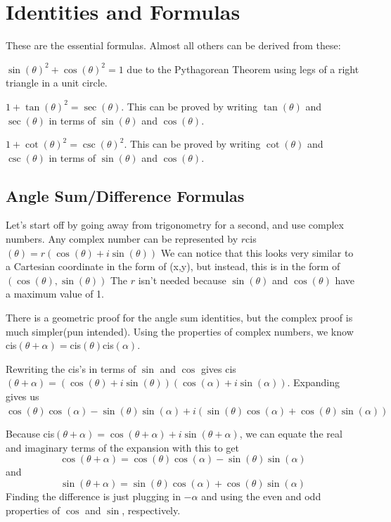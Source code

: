 \documentclass{article}
\begin{document}
\pagebreak
\section{Identities and Formulas}

These are the essential formulas. Almost all others can be derived from these:



\begin{theorem}
\noindent $\sin(\theta)^2+\cos(\theta)^2=1$ due to the Pythagorean Theorem using legs of a right triangle in a unit circle.

\vspace{5mm}
\noindent $1+\tan(\theta)^2=\sec(\theta)$. This can be proved by writing $\tan(\theta)$ and $\sec(\theta)$ in terms of $\sin(\theta)$ and $\cos(\theta)$. 

\vspace{5mm}
\noindent $1+\cot(\theta)^2=\csc(\theta)^2.$ This can be proved by writing $\cot(\theta)$ and $\csc(\theta)$ in terms of $\sin(\theta)$ and $\cos(\theta)$.
\end{theorem}

\subsection{Angle Sum/Difference Formulas}

Let's start off by going away from trigonometry for a second, and use complex numbers. Any complex number can be represented by $r$cis$(\theta)=r(\cos(\theta)+i\sin(\theta))$ We can notice that this looks very similar to a Cartesian coordinate in the form of (x,y), but instead, this is in the form of $(\cos(\theta),\sin(\theta))$ The $r$ isn't needed because $\sin(\theta)$ and $\cos(\theta)$ have a maximum value of 1. 

\vspace{5mm}
\noindent There is a geometric proof for the angle sum identities, but the complex proof is much simpler(pun intended). Using the properties of complex numbers, we know cis$(\theta+\alpha) = $cis$(\theta)$cis$(\alpha)$. 

\vspace{5mm}
\noindent Rewriting the cis's in terms of $\sin$ and $\cos$ gives cis$(\theta+\alpha) = (\cos(\theta)+i\sin(\theta))(\cos(\alpha)+i\sin(\alpha))$. Expanding gives us $\cos(\theta)\cos(\alpha)-\sin(\theta)\sin(\alpha)+i(\sin(\theta)\cos(\alpha)+\cos(\theta)\sin(\alpha))$  

\vspace{5mm}
\noindent Because cis$(\theta+\alpha) = \cos(\theta+\alpha)+i\sin(\theta+\alpha)$, we can equate the real and imaginary terms of the expansion with this to get $$\cos(\theta+\alpha) = \cos(\theta)\cos(\alpha)-\sin(\theta)\sin(\alpha)$$ and $$\sin(\theta+\alpha) = \sin(\theta)\cos(\alpha)+\cos(\theta)\sin(\alpha)$$ Finding the difference is just plugging in $-\alpha$ and using the even and odd properties of $\cos$ and $\sin$, respectively.
\end{document}
